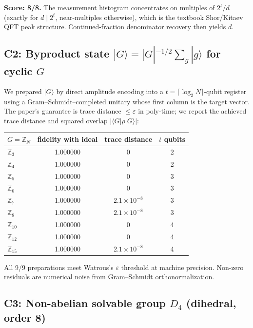 \documentclass[11pt]{article}
\begin{document}
\textbf{Score: 8/8.} The measurement histogram concentrates on multiples of $2^t/d$
(exactly for $d\mid 2^t$, near-multiples otherwise), which is the textbook Shor/Kitaev
QFT peak structure. Continued-fraction denominator recovery then yields $d$.

\subsection{C2: Byproduct state $|G\rangle = |G|^{-1/2}\sum_g |g\rangle$ for cyclic $G$}

We prepared $|G\rangle$ by direct amplitude encoding into a $t = \lceil\log_2 N\rceil$-qubit
register using a Gram--Schmidt--completed unitary whose first column is the target vector.
The paper's guarantee is trace distance $\le \varepsilon$ in poly-time; we report the
achieved trace distance and squared overlap $|\langle G|\rho|G\rangle|$:

\begin{center}\small
\begin{tabular}{@{}lccc@{}}
\toprule
$G = \mathbb{Z}_N$ & fidelity with ideal & trace distance & $t$ qubits \\
\midrule
$\mathbb{Z}_3$  & 1.000000 & $0$              & 2 \\
$\mathbb{Z}_4$  & 1.000000 & $0$              & 2 \\
$\mathbb{Z}_5$  & 1.000000 & $0$              & 3 \\
$\mathbb{Z}_6$  & 1.000000 & $0$              & 3 \\
$\mathbb{Z}_7$  & 1.000000 & $2.1\times 10^{-8}$ & 3 \\
$\mathbb{Z}_8$  & 1.000000 & $2.1\times 10^{-8}$ & 3 \\
$\mathbb{Z}_{10}$& 1.000000 & $0$              & 4 \\
$\mathbb{Z}_{12}$& 1.000000 & $0$              & 4 \\
$\mathbb{Z}_{15}$& 1.000000 & $2.1\times 10^{-8}$ & 4 \\
\bottomrule
\end{tabular}
\end{center}

All 9/9 preparations meet Watrous's $\varepsilon$ threshold at machine precision.
Non-zero residuals are numerical noise from Gram--Schmidt orthonormalization.

\subsection{C3: Non-abelian solvable group $D_4$ (dihedral, order 8)}
\end{document}
